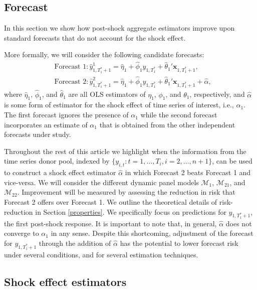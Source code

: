 \documentclass[11pt,3p,review,authoryear]{elsarticle}
\newcommand{\x}{\textbf{x}}
\def\mc#1{\mathcal{#1}} %
\theoremstyle{definition}
\begin{document}
\subsection{Forecast}
\label{forecast}
In this section we show how post-shock aggregate estimators improve upon standard 
forecasts that do not account for the shock effect.

More formally, we will consider the following candidate forecasts: 
\begin{align*}
  &\text{Forecast 1}: \hat y_{1,T_1^*+1}^1 = \hat\eta_1 
    + \hat\phi_1 y_{1,T_1^*} + \hat\theta_1'\x_{1,T_1^*+1} 
    , \\
  &\text{Forecast 2}: \hat y_{1,T_1^*+1}^2 = \hat\eta_1 
    + \hat\phi_1 y_{1,T_1^*} + \hat\theta_1'\x_{1,T_1^*+1} 
    + \hat{\alpha},
\end{align*}
where $\hat\eta_1$, $\hat\phi_1$, and $\hat\theta_1$ are all OLS estimators of $\eta_1$, $\phi_1$, and $\theta_1$, respectively, and $\hat{\alpha}$ is some form of estimator for the shock effect of time series of interest, i.e., $\alpha_1$. 
The first forecast ignores the presence of $\alpha_1$ while the second forecast 
incorporates an estimate of $\alpha_1$ that is obtained from the other independent forecasts under study. 

Throughout the rest of this article we highlight when the information from the time series donor pool, indexed by $\{y_{i,t} \colon t = 1,\ldots,T_i, i = 2,\ldots,n+1\}$, can be used to construct a shock effect estimator $\hat\alpha$ in which Forecast 2 beats Forecast 1 and vice-versa. We will consider the different dynamic panel models $\mc{M}_1$, $\mc{M}_{21}$, and $\mc{M}_{22}$. Improvement will be measured by assessing the reduction in risk that Forecast 2 offers over Forecast 1. We outline the theoretical details of risk-reduction in Section \ref{properties}. We specifically focus on predictions for $y_{1,T_1^*+1}$, the first post-shock response. It is important to note that, in general, $\hat{\alpha}$ does not converge to $\alpha_1$ in any sense.  Despite this shortcoming, adjustment of the forecast for $y_{1,T_1^*+1}$ through the addition of $\hat{\alpha}$ has the potential to lower forecast risk under several conditions, and for several estimation techniques.


\subsection{Shock effect estimators}
\label{constructionofestimators}
\end{document}
